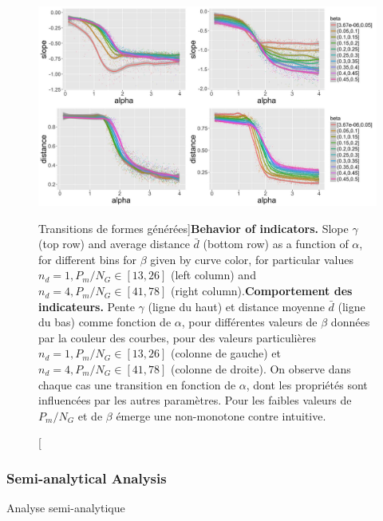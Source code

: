 \begin{figure}
\includegraphics[width=\linewidth]{Figures/Final/5-2-2-fig-density-fig3}
\caption[Behavior of indicators][Transitions de formes générées]{\textbf{Behavior of indicators.} Slope $\gamma$ (top row) and average distance $\bar{d}$ (bottom row) as a function of $\alpha$, for different bins for $\beta$ given by curve color, for particular values $n_d=1,P_m/N_G\in\left[13,26\right]$ (left column) and $n_d=4,P_m/N_G\in\left[41,78\right]$ (right column).\label{fig:density:fig3}}{\textbf{Comportement des indicateurs.} Pente $\gamma$ (ligne du haut) et distance moyenne $\bar{d}$ (ligne du bas) comme fonction de $\alpha$, pour différentes valeurs de $\beta$ données par la couleur des courbes, pour des valeurs particulières $n_d=1,P_m/N_G\in\left[13,26\right]$ (colonne de gauche) et $n_d=4,P_m/N_G\in\left[41,78\right]$ (colonne de droite). On observe dans chaque cas une transition en fonction de $\alpha$, dont les propriétés sont influencées par les autres paramètres. Pour les faibles valeurs de $P_m/N_G$ et de $\beta$ émerge une non-monotone contre intuitive.\label{fig:density:fig3}}
\end{figure}






\subsubsection{Semi-analytical Analysis}{Analyse semi-analytique}


